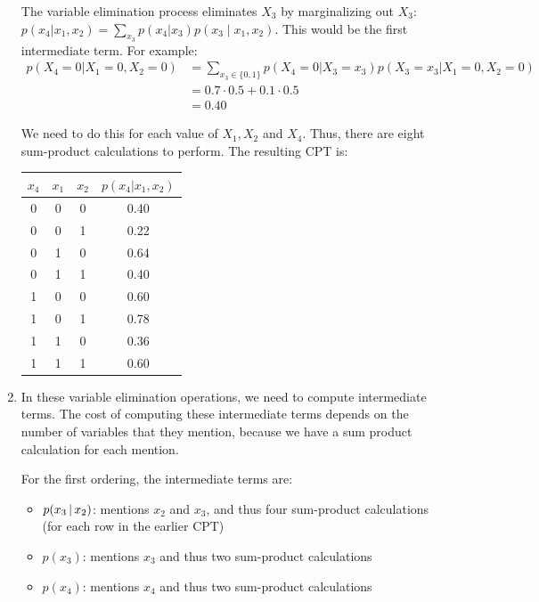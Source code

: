\documentclass[12pt]{article}
\begin{document}
\begin{solution}
\begin{enumerate}
\begin{center}

\end{center}

The variable elimination process eliminates $X_3$ by marginalizing out $X_3$: $p(x_4 | x_1, x_2) = \sum_{x_3} p(x_4 | x_3) p(x_3 \mid x_1, x_2)$. This would be the first intermediate term. 
For example: 
\begin{align*}
    p(X_4 = 0 | X_1 = 0, X_2 = 0) &= \sum_{x_3\in\{0,1\}} p(X_4 = 0 | X_3 = x_3) p(X_3 = x_3 | X_1 = 0, X_2 = 0)\\
    &= 0.7 \cdot 0.5 + 0.1 \cdot 0.5\\
    &= 0.40
\end{align*}

We need to do this for each value of $X_1, X_2$ and $X_4$. Thus,
there are eight sum-product calculations to perform. 
The resulting CPT is:
%
\begin{center}
\begin{tabular}{|c|c|c|c|}
\hline
{$x_4$}&{$x_1$}&{$x_2$}&{$p(x_4 | x_1, x_2)$} \\
\hline
0&0&0&0.40\\
0&0&1&0.22\\
0&1&0&0.64\\
0&1&1&0.40\\
1&0&0&0.60\\
1&0&1&0.78\\
1&1&0&0.36\\
1&1&1&0.60\\
\hline
\end{tabular}
\end{center}
 
\item In these variable elimination operations, we 
%
need to compute intermediate terms. The cost of computing these intermediate terms depends on the
number of variables that they mention, because we have a sum product calculation for each mention.

For the first ordering, the intermediate terms are:
%
\begin{itemize}
\item $p(x_3\,|\, x_2)$: mentions $x_2$ and $x_3$, and thus four sum-product calculations (for each row
in the earlier CPT)
\item $p(x_3)$: mentions $x_3$ and thus two sum-product calculations
\item $p(x_4)$: mentions $x_4$ and thus two sum-product calculations
\end{itemize}


\end{enumerate}
\end{solution}
\end{document}
